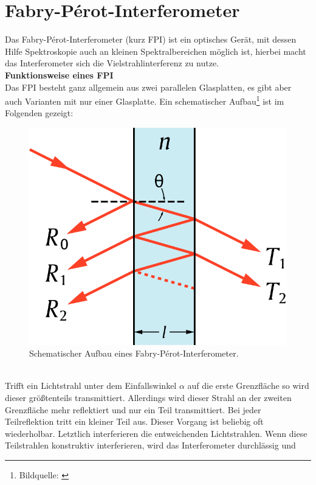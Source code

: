 \section{Fabry-Pérot-Interferometer}
Das Fabry-Pérot-Interferometer (kurz FPI) ist ein optisches Gerät, mit dessen Hilfe Spektroskopie auch an kleinen Spektralbereichen
möglich ist, hierbei macht das Interferometer sich die Vielstrahlinterferenz zu nutze. \\
\textbf{Funktionsweise eines FPI}\\
Das FPI besteht ganz allgemein aus zwei parallelen Glasplatten, es gibt aber auch Varianten mit nur einer Glasplatte. 
Ein schematischer Aufbau\footnote{Bildquelle: \citep[vgl.][]{fpi1}} ist im Folgenden gezeigt:\\
\begin{figure}[h]
    \centering
    \includegraphics[scale=0.2]{Bilder/FzV/FPI.png}
    \caption{Schematischer Aufbau eines Fabry-Pérot-Interferometer.}
\end{figure}\\
Trifft ein Lichtstrahl unter dem Einfallswinkel $\alpha$ auf die erste Grenzfläche 
so wird dieser größtenteils transmittiert. Allerdings wird dieser Strahl an der zweiten 
Grenzfläche mehr reflektiert und nur ein Teil transmittiert. Bei jeder Teilreflektion tritt 
ein kleiner Teil aus. 
Dieser Vorgang ist beliebig oft wiederholbar. 
Letztlich interferieren die entweichenden Lichtstrahlen. 
Wenn diese Teilstrahlen konstruktiv interferieren, wird das Interferometer durchlässig und 
